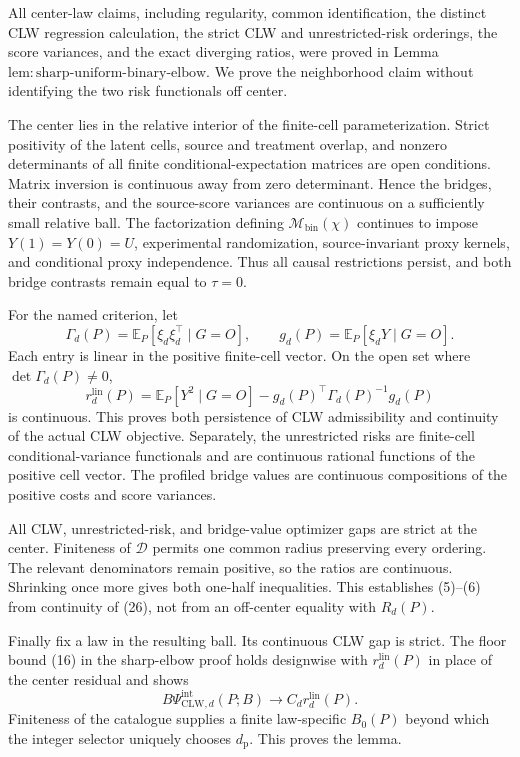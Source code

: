 All center-law claims, including regularity, common identification, the distinct CLW regression calculation, the strict CLW and unrestricted-risk orderings, the score variances, and the exact diverging ratios, were proved in Lemma~\(\mathrm{lem{:}sharp\text{-}uniform\text{-}binary\text{-}elbow}\).  We prove the neighborhood claim without identifying the two risk functionals off center.

The center lies in the relative interior of the finite-cell parameterization.  Strict positivity of the latent cells, source and treatment overlap, and nonzero determinants of all finite conditional-expectation matrices are open conditions.  Matrix inversion is continuous away from zero determinant.  Hence the bridges, their contrasts, and the source-score variances are continuous on a sufficiently small relative ball.  The factorization defining \(\mathcal M_{\mathrm{bin}}(\chi)\) continues to impose \(Y(1)=Y(0)=U\), experimental randomization, source-invariant proxy kernels, and conditional proxy independence.  Thus all causal restrictions persist, and both bridge contrasts remain equal to \(\tau=0\).

For the named criterion, let
\[
 \Gamma_d(P)=\mathbb E_P[\xi_d\xi_d^\top\mid G=O],
 \qquad g_d(P)=\mathbb E_P[\xi_dY\mid G=O].
\]
Each entry is linear in the positive finite-cell vector.  On the open set where \(\det\Gamma_d(P)\ne0\),
\[
 r_d^{\mathrm{lin}}(P)
 =\mathbb E_P[Y^2\mid G=O]-g_d(P)^\top\Gamma_d(P)^{-1}g_d(P) \tag{26}
\]
is continuous.  This proves both persistence of CLW admissibility and continuity of the actual CLW objective.  Separately, the unrestricted risks are finite-cell conditional-variance functionals and are continuous rational functions of the positive cell vector.  The profiled bridge values are continuous compositions of the positive costs and score variances.

All CLW, unrestricted-risk, and bridge-value optimizer gaps are strict at the center.  Finiteness of \(\mathcal D\) permits one common radius preserving every ordering.  The relevant denominators remain positive, so the ratios are continuous.  Shrinking once more gives both one-half inequalities.  This establishes (5)--(6) from continuity of (26), not from an off-center equality with \(R_d(P)\).

Finally fix a law in the resulting ball.  Its continuous CLW gap is strict.  The floor bound (16) in the sharp-elbow proof holds designwise with \(r_d^{\mathrm{lin}}(P)\) in place of the center residual and shows
\[
 B\Psi_{\mathrm{CLW},d}^{\mathrm{int}}(P;B)
 \longrightarrow C_dr_d^{\mathrm{lin}}(P).
\]
Finiteness of the catalogue supplies a finite law-specific \(B_0(P)\) beyond which the integer selector uniquely chooses \(d_{\mathrm p}\).  This proves the lemma.